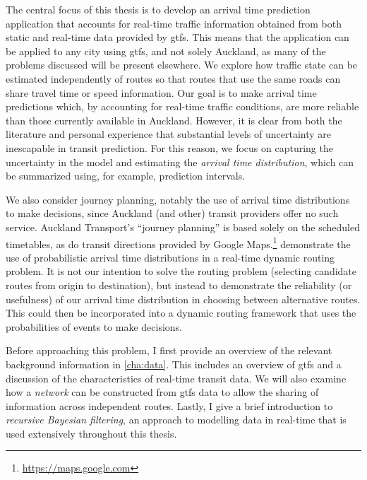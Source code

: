 The central focus of this thesis is to develop an arrival time prediction application that accounts for real-time traffic information obtained from both static and real-time data provided by \gls{gtfs}. This means that the application can be applied to any city using \gls{gtfs}, and not solely Auckland, as many of the problems discussed will be present elsewhere. We explore how traffic state can be estimated independently of routes so that routes that use the same roads can share travel time or speed information. Our goal is to make arrival time predictions which, by accounting for real-time traffic conditions, are more reliable than those currently available in Auckland. However, it is clear from both the literature and personal experience that substantial levels of uncertainty are inescapable in transit prediction. For this reason, we focus on capturing the uncertainty in the model and estimating the \emph{arrival time distribution}, which can be summarized using, for example, prediction intervals.


We also consider journey planning, notably the use of arrival time distributions to make decisions, since Auckland (and other) transit providers offer no such service. Auckland Transport's ``journey planning'' is based solely on the scheduled timetables, as do transit directions provided by Google Maps.\footnote{\url{https://maps.google.com}}  demonstrate the use of probabilistic arrival time distributions in a real-time dynamic routing problem. It is not our intention to solve the routing problem (selecting candidate routes from origin to destination), but instead to demonstrate the reliability (or usefulness) of our arrival time distribution in choosing between alternative routes. This could then be incorporated into a dynamic routing framework that uses the probabilities of events to make decisions.


Before approaching this problem, I first provide an overview of the relevant background information in \cref{cha:data}. This includes an overview of \gls{gtfs} and a discussion of the characteristics of real-time transit data. We will also examine how a \emph{network} can be constructed from \gls{gtfs} data to allow the sharing of information across independent routes. Lastly, I give a brief introduction to \emph{recursive Bayesian filtering}, an approach to modelling data in real-time that is used extensively throughout this thesis.


